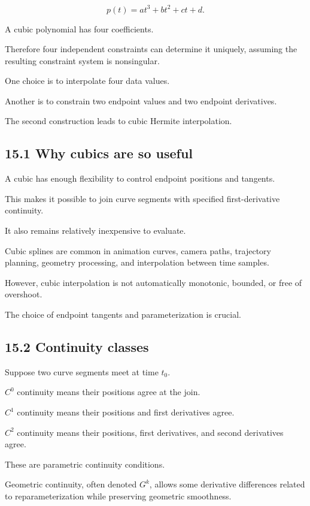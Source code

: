 \[ \boxed{ p(t)=at^3+bt^2+ct+d. } \]

A cubic polynomial has four coefficients.

Therefore four independent constraints can determine it uniquely, assuming the resulting constraint system is nonsingular.

One choice is to interpolate four data values.

Another is to constrain two endpoint values and two endpoint derivatives.

The second construction leads to cubic Hermite interpolation.

\subsection{15.1 Why cubics are so useful}\label{02-foundations-ii-ch028-why-cubics-are-so-useful}

A cubic has enough flexibility to control endpoint positions and tangents.

This makes it possible to join curve segments with specified first-derivative continuity.

It also remains relatively inexpensive to evaluate.

Cubic splines are common in animation curves, camera paths, trajectory planning, geometry processing, and interpolation between time samples.

However, cubic interpolation is not automatically monotonic, bounded, or free of overshoot.

The choice of endpoint tangents and parameterization is crucial.

\subsection{15.2 Continuity classes}\label{02-foundations-ii-ch028-continuity-classes}

Suppose two curve segments meet at time \(t_0\).

\(C^0\) continuity means their positions agree at the join.

\(C^1\) continuity means their positions and first derivatives agree.

\(C^2\) continuity means their positions, first derivatives, and second derivatives agree.

These are parametric continuity conditions.

Geometric continuity, often denoted \(G^k\), allows some derivative differences related to reparameterization while preserving geometric smoothness.


